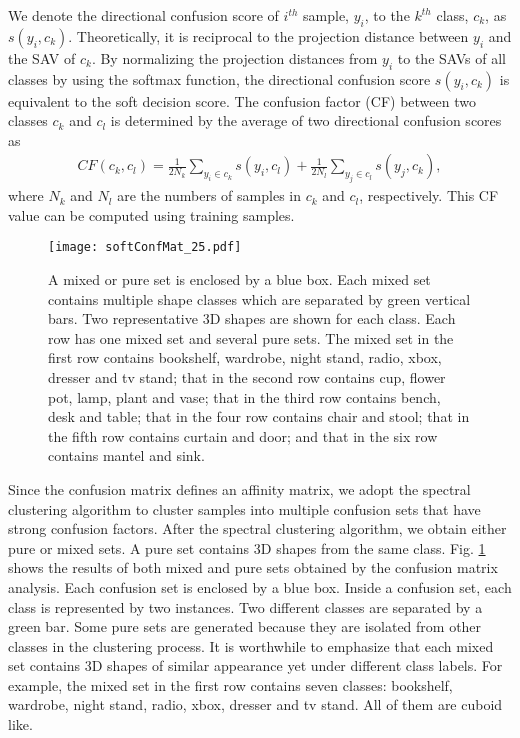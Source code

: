 \documentclass[preprint,12pt]{elsarticle}
\begin{document}
We denote the directional confusion score of $i^{th}$ sample, $y_i$, to
the $k^{th}$ class, $c_k$, as $s(y_i, c_k)$. Theoretically, it is reciprocal to the projection distance between $y_i$ and the SAV of $c_k$. By normalizing the projection distances from $y_i$ to the SAVs of all classes by using the softmax function, the directional confusion score $s(y_i, c_k)$ is equivalent to the soft decision score.
The confusion factor (CF) between two classes $c_k$ and $c_l$ is determined
by the average of two directional confusion scores as
\begin{align} \label{eq.confMat}
CF(c_k, c_l) = \frac{1}{2N_k}\sum_{y_i \in c_k} s(y_i, c_l) + \frac{1}{2N_l}\sum_{y_j \in c_l} s(y_j, c_k),
\end{align}
where $N_k$ and $N_l$ are the numbers of samples in $c_k$ and $c_l$,
respectively. This CF value can be computed using training samples.

\begin{figure}[t]
\centering
\texttt{[image: softConfMat\_25.pdf]}
\caption{A mixed or pure set is enclosed by a blue box.  Each mixed set contains multiple shape classes which are separated by
green vertical bars. Two representative 3D shapes are shown for each
class. Each row has one mixed set and several pure sets. The mixed set in the first row contains bookshelf, wardrobe, night
stand, radio, xbox, dresser and tv stand; that in the second row
contains cup, flower pot, lamp, plant and vase; that in the third row
contains bench, desk and table; that in the four row contains chair and
stool; that in the fifth row contains curtain and door; and that in the
six row contains mantel and sink.}\label{fig.confgroups}
\end{figure}

Since the confusion matrix defines an affinity matrix, we adopt the
spectral clustering algorithm \cite{ng2002spectral} to cluster samples
into multiple confusion sets that have strong confusion
factors.  After the spectral clustering algorithm, we obtain either pure
or mixed sets. A pure set contains 3D shapes from the same class. Fig. \ref{fig.confgroups} shows the results of both mixed and pure sets obtained by the confusion matrix analysis. Each confusion set is
enclosed by a blue box. Inside a confusion set, each class is
represented by two instances. Two different classes are separated by a
green bar.  Some pure sets are generated because they are isolated from
other classes in the clustering process. It is worthwhile to emphasize that
each mixed set contains 3D shapes of similar appearance yet under
different class labels.  For example, the mixed set in the first row
contains seven classes: bookshelf, wardrobe, night stand, radio, xbox,
dresser and tv stand. All of them are cuboid like. 
\end{document}
